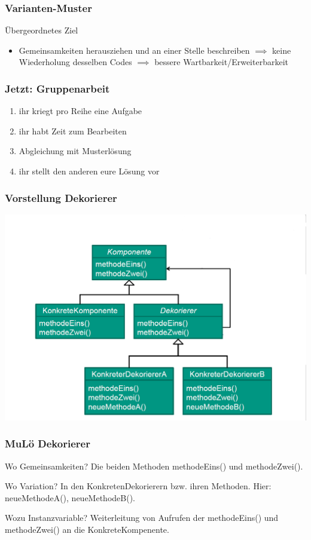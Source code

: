 \documentclass[18pt]{beamer}
\begin{document}
	\begin{frame}
		\frametitle{Varianten-Muster}
		\begin{block}{Übergeordnetes Ziel}
			\begin{itemize}
				\item Gemeinsamkeiten herausziehen und an einer Stelle beschreiben \pause
				\linebreak $\implies$ keine Wiederholung desselben Codes \pause
				\linebreak $\implies$ bessere Wartbarkeit/Erweiterbarkeit		
			\end{itemize}
		\end{block}
	\end{frame}
	
	\begin{frame}
		\frametitle{Jetzt: Gruppenarbeit}
		\begin{enumerate}
			\item ihr kriegt pro Reihe eine Aufgabe
			\item ihr habt Zeit zum Bearbeiten
			\item Abgleichung mit Musterlösung
			\item ihr stellt den anderen eure Lösung vor
		\end{enumerate}
	\end{frame}

	\begin{frame}
		\frametitle{Vorstellung Dekorierer}
		\includegraphics[scale=0.35]{./pics/tut4/decor.png}
	\end{frame}

	\begin{frame}
		\frametitle{MuLö Dekorierer}
		\begin{block}{Wo Gemeinsamkeiten?}
			Die beiden Methoden methodeEins() und methodeZwei().
		\end{block}
		\begin{block}{Wo Variation?}
			In den KonkretenDekorierern bzw. ihren Methoden. Hier: neueMethodeA(), neueMethodeB().
		\end{block}
		\begin{block}{Wozu Instanzvariable?}
			Weiterleitung von Aufrufen der methodeEins() und methodeZwei() an die KonkreteKompenente.
		\end{block}
	\end{frame}
\end{document}
